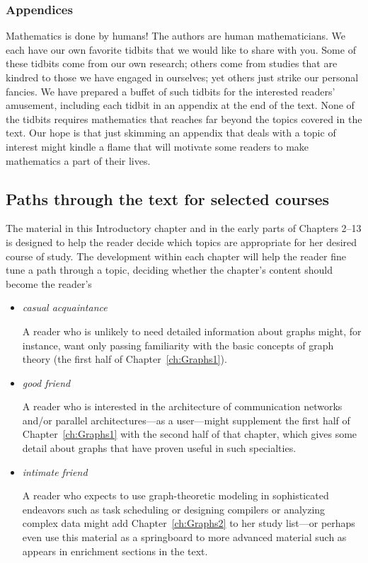 \subsubsection{Appendices}

Mathematics is done by humans!  The authors are human mathematicians.  We each have our own favorite tidbits that we would like to share with you.  Some of these tidbits come from our own research; others come from studies that are kindred to those we have engaged in ourselves; yet others just strike our personal fancies.  We have prepared a buffet of such tidbits for the interested readers' amusement, including each tidbit in an appendix at the end of the text.  None of the tidbits requires mathematics that reaches far beyond the topics covered in the text.  Our hope is that just skimming an appendix that deals with a topic of interest might kindle a flame that will motivate some readers to make mathematics a part of their lives.


\subsection{Paths through the text for selected courses}

The material in this Introductory chapter and in the early parts of Chapters 2--13 is designed to help the reader decide which topics are appropriate for her desired course of study.  The development within each chapter will help the reader fine tune a path through a topic, deciding whether the chapter's content should become the reader's
\begin{itemize}
\item
{\em casual acquaintance}

\smallskip

A reader who is unlikely to need detailed information about graphs might, for instance, want only passing familiarity with the basic concepts of graph theory (the first half of Chapter~\ref{ch:Graphs1}).

\medskip\item
{\em good friend}

\smallskip

A reader who is interested in the architecture of communication networks and/or parallel architectures---as a user---might supplement the first half of Chapter~\ref{ch:Graphs1} with the second half of that chapter, which gives some detail about graphs that have proven useful in such specialties.

\medskip\item
{\em intimate friend}

\smallskip

A reader who expects to use graph-theoretic modeling in sophisticated endeavors such as task scheduling or designing compilers or analyzing complex data might add Chapter~\ref{ch:Graphs2} to her study list---or perhaps even use this material as a springboard to more advanced material such as appears in enrichment sections in the text.
\end{itemize}

